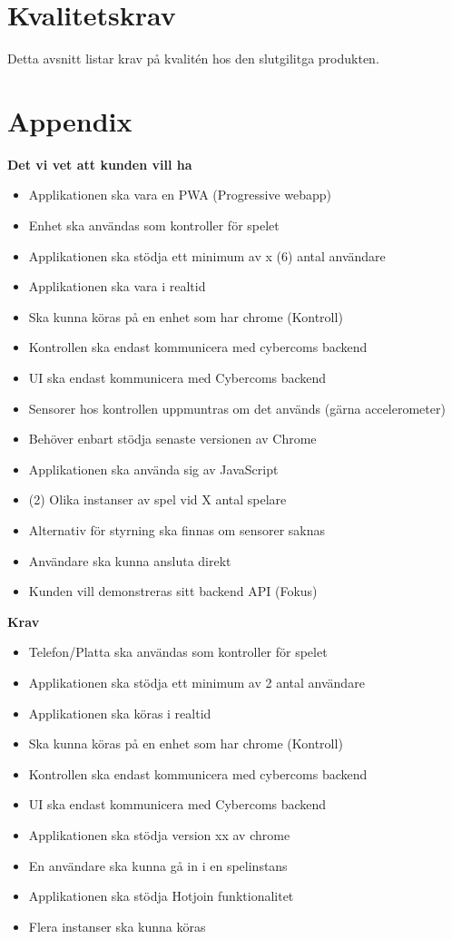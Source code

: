 \documentclass[10pt]{article}
\begin{document}
\section{Kvalitetskrav}
	Detta avsnitt listar krav på kvalitén hos den slutgilitga produkten.
\pagebreak
\section{Appendix}
	\hfill
	\begin{center}\textbf{Det vi vet att kunden vill ha}\end{center}
	\begin{itemize}
	\item Applikationen ska vara en PWA (Progressive webapp)
	\item Enhet ska användas som kontroller för spelet
	\item Applikationen ska stödja ett minimum av x (6) antal användare
	\item Applikationen ska vara i realtid
	\item Ska kunna köras på en enhet som har chrome (Kontroll)
	\item Kontrollen ska endast kommunicera med cybercoms backend
	\item UI ska endast kommunicera med Cybercoms backend
	\item Sensorer hos kontrollen uppmuntras om det används (gärna accelerometer)
	\item Behöver enbart stödja senaste versionen av Chrome
	\item Applikationen ska använda sig av JavaScript
	\item (2) Olika instanser av spel vid X antal spelare
	\item Alternativ för styrning ska finnas om sensorer saknas
	\item Användare ska kunna ansluta direkt
	\item Kunden vill demonstreras sitt backend API (Fokus)
	\end{itemize}
	\bigskip
	\begin{center}\textbf{Krav}\end{center}
	\begin{itemize}
		\item Telefon/Platta ska användas som kontroller för spelet
		\item Applikationen ska stödja ett minimum av 2 antal användare
		\item Applikationen ska köras i realtid
		\item Ska kunna köras på en enhet som har chrome (Kontroll)
		\item Kontrollen ska endast kommunicera med cybercoms backend
		\item UI ska endast kommunicera med Cybercoms backend
		\item Applikationen ska stödja version xx av chrome
		\item En användare ska kunna gå in i en spelinstans
		\item Applikationen ska stödja Hotjoin funktionalitet
		\item Flera instanser ska kunna köras
	\end{itemize}
\end{document}
